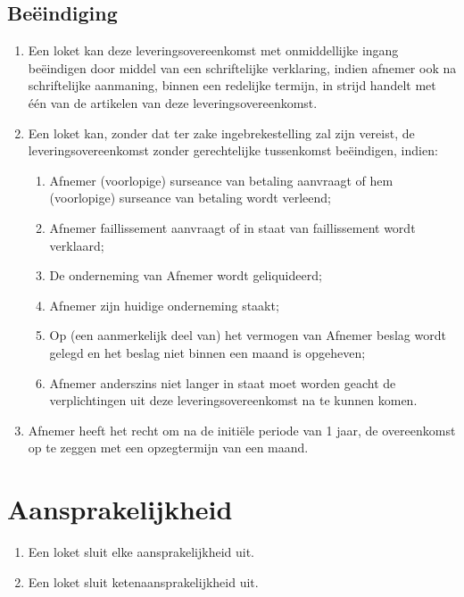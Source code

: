 \documentclass[10pt, a4paper]{article}
\begin{document}
\subsection*{Beëindiging}
\begin{enumerate}
   \item Een loket kan deze leveringsovereenkomst met onmiddellijke ingang beëindigen door middel van een schriftelijke verklaring, indien afnemer ook na schriftelijke aanmaning, binnen een redelijke termijn, in strijd handelt met één van de artikelen van deze leveringsovereenkomst.
   \item Een loket kan, zonder dat ter zake ingebrekestelling zal zijn vereist, de leveringsovereenkomst zonder gerechtelijke tussenkomst beëindigen, indien:
      \begin{enumerate}
      \item Afnemer (voorlopige) surseance van betaling aanvraagt of hem (voorlopige) surseance van betaling wordt verleend;
      \item Afnemer faillissement aanvraagt of in staat van faillissement wordt verklaard;
      \item De onderneming van Afnemer wordt geliquideerd;
      \item Afnemer zijn huidige onderneming staakt;
      \item Op (een aanmerkelijk deel van) het vermogen van Afnemer beslag wordt gelegd en het beslag niet binnen een maand is opgeheven;
      \item Afnemer anderszins niet langer in staat moet worden geacht de verplichtingen uit deze leveringsovereenkomst na te kunnen komen.
      \end{enumerate}
    \item Afnemer heeft het recht om na de initiële periode van 1 jaar, de overeenkomst op te zeggen met een opzegtermijn van een maand.
\end{enumerate}
\newpage


\section{Aansprakelijkheid}
\begin{enumerate}
   \item Een loket sluit elke aansprakelijkheid uit.
   \item Een loket sluit ketenaansprakelijkheid uit.
\end{enumerate}
\end{document}

